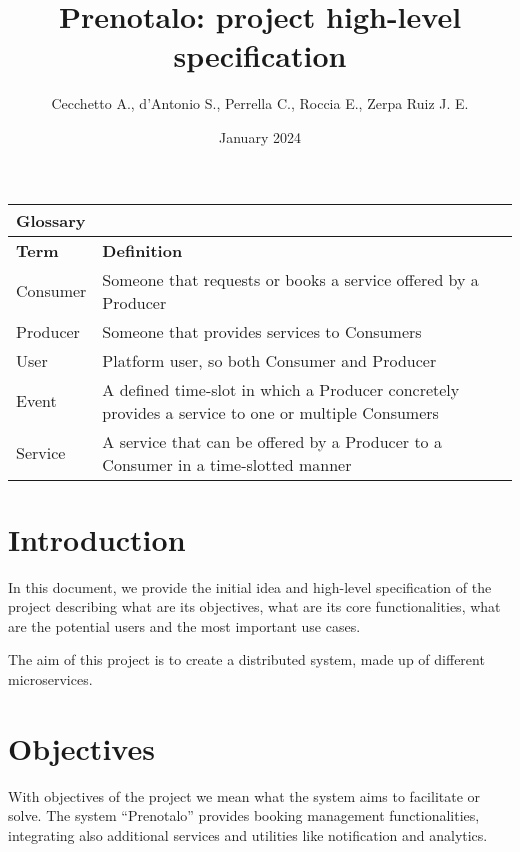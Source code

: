 \documentclass{article}
\title{Prenotalo: project high-level specification}
\author{Cecchetto A., d'Antonio S., Perrella C., Roccia E., Zerpa Ruiz J. E.}
\date{January 2024}
\begin{document}
\maketitle

\begin{table}[!h]
\centering
\begin{tabular}{l l}
\multicolumn{2}{l}{\textbf{Glossary}} \\
\hline
\textbf{Term} & \textbf{Definition} \\
\hline
Consumer & Someone that requests or books a service offered by a Producer \\
\hline
Producer & Someone that provides services to Consumers \\
\hline
User & Platform user, so both Consumer and Producer \\
\hline
Event & A defined time-slot in which a Producer concretely provides a service
	to one or multiple Consumers\\
\hline
Service & A service that can be offered by a Producer to a Consumer in a
	time-slotted manner\\ \hline
\end{tabular}

\end{table}


\section{Introduction}
In this document, we provide the initial idea and high-level specification of
the project describing what are its objectives, what are its core
functionalities, what are the potential users and the most important use cases.

The aim of this project is to create a distributed system, made up of different
microservices. 

\section{Objectives}
With objectives of the project we mean what the system aims to facilitate or
solve. The system “Prenotalo” provides booking management functionalities,
integrating also additional services and utilities like notification and analytics.
\end{document}
